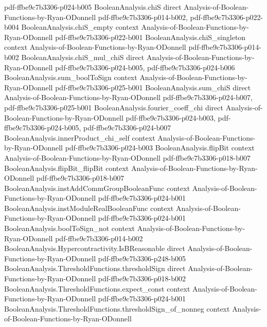 \begin{lemma}
  {pdf-ffbe9c7b3306-p024-b005}
\proofstep
  {BooleanAnalysis.chiS}
  {direct}
  {Analysis-of-Boolean-Functions-by-Ryan-ODonnell}
  {pdf-ffbe9c7b3306-p014-b002,
    pdf-ffbe9c7b3306-p022-b004}
\proofstep
  {BooleanAnalysis.chiS_empty}
  {context}
  {Analysis-of-Boolean-Functions-by-Ryan-ODonnell}
  {pdf-ffbe9c7b3306-p022-b001}
\proofstep
  {BooleanAnalysis.chiS_singleton}
  {context}
  {Analysis-of-Boolean-Functions-by-Ryan-ODonnell}
  {pdf-ffbe9c7b3306-p014-b002}
\proofstep
  {BooleanAnalysis.chiS_mul_chiS}
  {direct}
  {Analysis-of-Boolean-Functions-by-Ryan-ODonnell}
  {pdf-ffbe9c7b3306-p024-b005,
    pdf-ffbe9c7b3306-p024-b006}
\proofstep
  {BooleanAnalysis.sum_boolToSign}
  {context}
  {Analysis-of-Boolean-Functions-by-Ryan-ODonnell}
  {pdf-ffbe9c7b3306-p025-b001}
\proofstep
  {BooleanAnalysis.sum_chiS}
  {direct}
  {Analysis-of-Boolean-Functions-by-Ryan-ODonnell}
  {pdf-ffbe9c7b3306-p024-b007,
    pdf-ffbe9c7b3306-p025-b001}
\proofstep
  {BooleanAnalysis.fourier_coeff_chi}
  {direct}
  {Analysis-of-Boolean-Functions-by-Ryan-ODonnell}
  {pdf-ffbe9c7b3306-p024-b003,
    pdf-ffbe9c7b3306-p024-b005,
    pdf-ffbe9c7b3306-p024-b007}
\proofstep
  {BooleanAnalysis.innerProduct_chi_self}
  {context}
  {Analysis-of-Boolean-Functions-by-Ryan-ODonnell}
  {pdf-ffbe9c7b3306-p024-b003}
\proofstep
  {BooleanAnalysis.flipBit}
  {context}
  {Analysis-of-Boolean-Functions-by-Ryan-ODonnell}
  {pdf-ffbe9c7b3306-p018-b007}
\proofstep
  {BooleanAnalysis.flipBit_flipBit}
  {context}
  {Analysis-of-Boolean-Functions-by-Ryan-ODonnell}
  {pdf-ffbe9c7b3306-p018-b007}
\proofstep
  {BooleanAnalysis.instAddCommGroupBooleanFunc}
  {context}
  {Analysis-of-Boolean-Functions-by-Ryan-ODonnell}
  {pdf-ffbe9c7b3306-p024-b001}
\proofstep
  {BooleanAnalysis.instModuleRealBooleanFunc}
  {context}
  {Analysis-of-Boolean-Functions-by-Ryan-ODonnell}
  {pdf-ffbe9c7b3306-p024-b001}
\proofstep
  {BooleanAnalysis.boolToSign_not}
  {context}
  {Analysis-of-Boolean-Functions-by-Ryan-ODonnell}
  {pdf-ffbe9c7b3306-p014-b002}
\proofstep
  {BooleanAnalysis.Hypercontractivity.IsBReasonable}
  {direct}
  {Analysis-of-Boolean-Functions-by-Ryan-ODonnell}
  {pdf-ffbe9c7b3306-p248-b005}
\proofstep
  {BooleanAnalysis.ThresholdFunctions.thresholdSign}
  {direct}
  {Analysis-of-Boolean-Functions-by-Ryan-ODonnell}
  {pdf-ffbe9c7b3306-p018-b002}
\proofstep
  {BooleanAnalysis.ThresholdFunctions.expect_const}
  {context}
  {Analysis-of-Boolean-Functions-by-Ryan-ODonnell}
  {pdf-ffbe9c7b3306-p024-b001}
\proofstep
  {BooleanAnalysis.ThresholdFunctions.thresholdSign_of_nonneg}
  {context}
  {Analysis-of-Boolean-Functions-by-Ryan-ODonnell}

\end{lemma}
